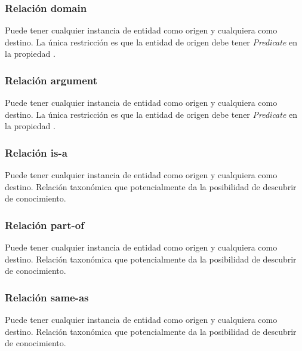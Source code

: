 \vspace{-0.2in}
\subsubsection{Relación domain}
Puede tener cualquier instancia de entidad como origen y cualquiera como destino. La única restricción es que la entidad de origen debe tener \textit{Predicate} en la propiedad .

\vspace{-0.1in}
\subsubsection{Relación argument}
\vspace{-0.1in}
Puede tener cualquier instancia de entidad como origen y cualquiera como destino. La única restricción es que la entidad de origen debe tener \textit{Predicate} en la propiedad .

\vspace{-0.1in}
\subsubsection{Relación is-a}
\vspace{-0.1in}
Puede tener cualquier instancia de entidad como origen y cualquiera como destino. Relación taxonómica que potencialmente da la posibilidad de descubrir de conocimiento.

\vspace{-0.1in}
\subsubsection{Relación part-of}
\vspace{-0.1in}
Puede tener cualquier instancia de entidad como origen y cualquiera como destino. Relación taxonómica que potencialmente da la posibilidad de descubrir de conocimiento.

\vspace{-0.1in}
\subsubsection{Relación same-as}
\vspace{-0.1in}
Puede tener cualquier instancia de entidad como origen y cualquiera como destino. Relación taxonómica que potencialmente da la posibilidad de descubrir de conocimiento.

